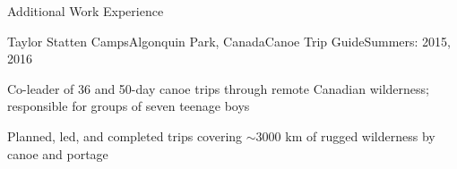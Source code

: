 \documentclass{resume} %
\begin{document}
\begin{rSection}{Additional Work Experience}



\begin{rSubsection}{Taylor Statten Camps}{Algonquin Park, Canada}{Canoe Trip Guide}{Summers: 2015, 2016}

\item Co-leader of 36 and 50-day canoe trips through remote Canadian wilderness; responsible for groups of seven teenage boys
\item Planned, led, and completed trips covering ${\sim}3000$ km of rugged wilderness by canoe and portage

\end{rSubsection}

\end{rSection}


%
%
%
%
%
%




\end{document}
